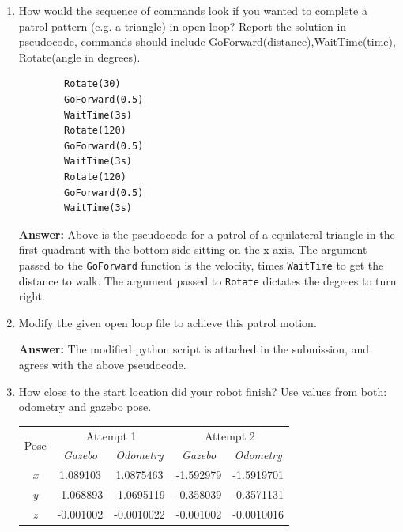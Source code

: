 \documentclass[12pt]{article}
\begin{document}
\begin{enumerate}
    \item How would the sequence of commands look if you wanted to complete a patrol pattern (e.g. a triangle) in open-loop? Report the solution in pseudocode, commands should include GoForward(distance),WaitTime(time), Rotate(angle in degrees).
    
    \vspace{-3ex}
    \begin{verbatim}
        Rotate(30)
        GoForward(0.5)
        WaitTime(3s)
        Rotate(120)
        GoForward(0.5)
        WaitTime(3s)
        Rotate(120)
        GoForward(0.5)
        WaitTime(3s)
    \end{verbatim}
    \vspace{-4ex}

    \textbf{Answer: }Above is the pseudocode for a patrol of a equilateral triangle in the first quadrant with the bottom side sitting on the x-axis. The argument passed to the \texttt{GoForward} function is the velocity, times \texttt{WaitTime} to get the distance to walk. The argument passed to \texttt{Rotate} dictates the degrees to turn right.

    \item Modify the given open loop file to achieve this patrol motion.
    
    \textbf{Answer: }The modified python script is attached in the submission, and agrees with the above pseudocode.

    \item How close to the start location did your robot finish? Use values from both: odometry and gazebo pose.
    
    \begin{table}[H]
    \centering
    \begin{tabular}{|c|cc|cc|}
    \hline
    \multirow{2}{*}{Pose} & \multicolumn{2}{c|}{Attempt 1}                  & \multicolumn{2}{c|}{Attempt 2}                  \\ \cline{2-5} 
                                   & \multicolumn{1}{c|}{\textit{Gazebo}} & \textit{Odometry} & \multicolumn{1}{c|}{\textit{Gazebo}} & \textit{Odometry} \\ \hline
    \textit{x} & \multicolumn{1}{c|}{1.089103}  & 1.0875463  & \multicolumn{1}{c|}{-1.592979} & -1.5919701 \\ \hline
    \textit{y} & \multicolumn{1}{c|}{-1.068893} & -1.0695119 & \multicolumn{1}{c|}{-0.358039} & -0.3571131 \\ \hline
    \textit{z} & \multicolumn{1}{c|}{-0.001002} & -0.0010022 & \multicolumn{1}{c|}{-0.001002} & -0.0010016 \\ \hline
    \end{tabular}
    \end{table}
    \vspace{-2ex}
    

\end{enumerate}
\end{document}
